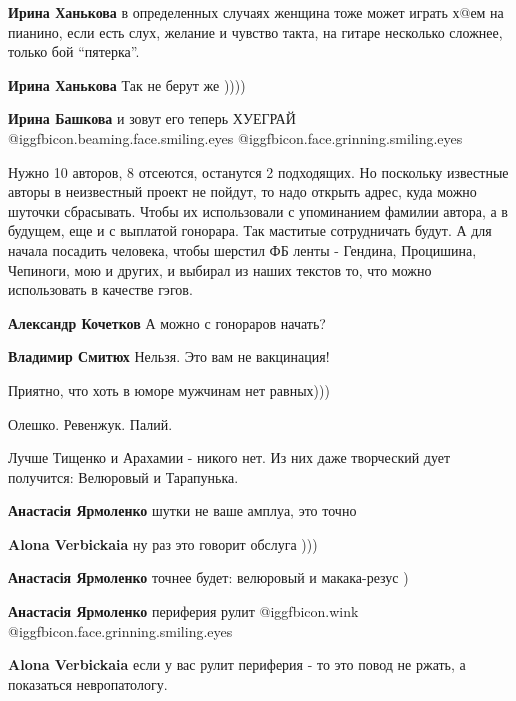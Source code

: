 \begin{itemize}
\begin{itemize} %
\textbf{Ирина Ханькова} в определенных случаях женщина тоже может играть х@ем на пианино, если есть слух, желание и чувство такта, на гитаре несколько сложнее, только бой \enquote{пятерка}.

\textbf{Ирина Ханькова}
Так не берут же ))))

\textbf{Ирина Башкова} и зовут его теперь ХУЕГРАЙ @igg{fbicon.beaming.face.smiling.eyes}  @igg{fbicon.face.grinning.smiling.eyes} 
\end{itemize} %


Нужно 10 авторов, 8 отсеются, останутся 2 подходящих. Но поскольку известные
авторы в неизвестный проект не пойдут, то надо открыть адрес, куда можно
шуточки сбрасывать. Чтобы их использовали с упоминанием фамилии автора, а в
будущем, еще и с выплатой гонорара. Так маститые сотрудничать будут. А для
начала посадить человека, чтобы шерстил ФБ ленты - Гендина, Процишина,
Чепиноги, мою и других, и выбирал из наших текстов то, что можно использовать в
качестве гэгов.

\begin{itemize} %
\textbf{Александр Кочетков} А можно с гонораров начать?

\textbf{Владимир Смитюх} Нельзя. Это вам не вакцинация!
\end{itemize} %

Приятно, что хоть в юморе мужчинам нет равных)))

Олешко. Ревенжук. Палий.

Лучше Тищенко и Арахамии - никого нет. Из них даже творческий дует получится: Велюровый и Тарапунька.

\begin{itemize} %
\textbf{Анастасія Ярмоленко} шутки не ваше амплуа, это точно

\textbf{Alona Verbickaia} ну раз это говорит обслуга )))

\textbf{Анастасія Ярмоленко} точнее будет: велюровый и макака-резус )

\textbf{Анастасія Ярмоленко} периферия рулит @igg{fbicon.wink}  @igg{fbicon.face.grinning.smiling.eyes} 

\textbf{Alona Verbickaia} если у вас рулит периферия - то это повод не ржать, а показаться невропатологу.
\end{itemize} %


\end{itemize}
